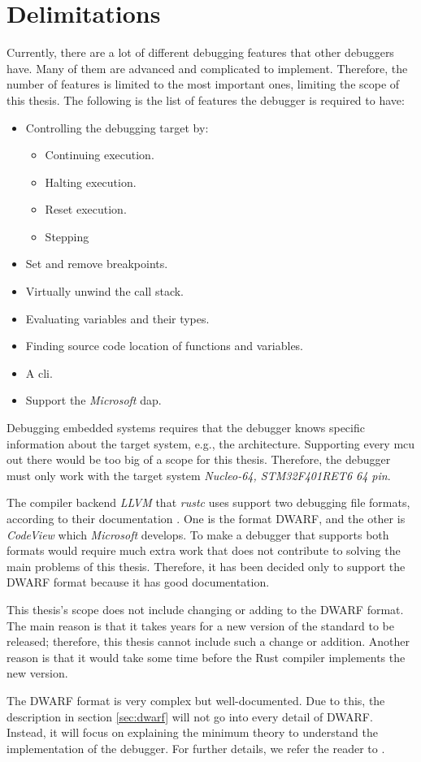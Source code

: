 \section{Delimitations}
\label{sec:delimitations}
Currently, there are a lot of different debugging features that other debuggers have.
Many of them are advanced and complicated to implement.
Therefore, the number of features is limited to the most important ones, limiting the scope of this thesis.
The following is the list of features the debugger is required to have:


\begin{itemize} \label{list:debuggerfeatures}
  \item Controlling the debugging target by:
  \begin{itemize}
    \item Continuing execution.
    \item Halting execution.
    \item Reset execution.
    \item Stepping
  \end{itemize}
  \item Set and remove breakpoints.
  \item Virtually unwind the call stack.
  \item Evaluating variables and their types.
  \item Finding source code location of functions and variables.
  \item A \acrfull{cli}.
  \item Support the \emph{Microsoft} \acrfull{dap}.
\end{itemize}


Debugging embedded systems requires that the debugger knows specific information about the target system, e.g., the architecture.
Supporting every \gls{mcu} out there would be too big of a scope for this thesis.
Therefore, the debugger must only work with the target system \emph{Nucleo-64, STM32F401RET6 64 pin}.


The compiler backend \emph{LLVM} that \emph{rustc} uses support two debugging file formats, according to their documentation \cite{llvm-dbs}.
One is the format \gls{DWARF}, and the other is \emph{CodeView} which \emph{Microsoft} develops.
To make a debugger that supports both formats would require much extra work that does not contribute to solving the main problems of this thesis.
Therefore, it has been decided only to support the \gls{DWARF} format because it has good documentation.


This thesis's scope does not include changing or adding to the \gls{DWARF} format.
The main reason is that it takes years for a new version of the standard to be released; therefore, this thesis cannot include such a change or addition.
Another reason is that it would take some time before the Rust compiler implements the new version.


The \gls{DWARF} format is very complex but well-documented.
Due to this, the description in section \ref{sec:dwarf} will not go into every detail of \gls{DWARF}.
Instead, it will focus on explaining the minimum theory to understand the implementation of the debugger.
For further details, we refer the reader to \cite{dwarf}.

